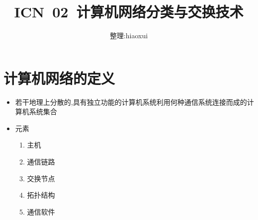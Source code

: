 \documentclass[a4paper,12pt,notitlepage]{article}
\begin{document}
\title{ICN\ 02\ 计算机网络分类与交换技术}
\author{整理:hiaoxui}
\maketitle

\section{计算机网络的定义}

\begin{itemize}
	\item 若干地理上分散的,具有独立功能的计算机系统利用何种通信系统连接而成的计算机系统集合
	\item 元素
	\begin{enumerate}
		\item 主机
		\item 通信链路
		\item 交换节点
		\item 拓扑结构
		\item 通信软件
	\end{enumerate}
\end{itemize} 
\end{document}
